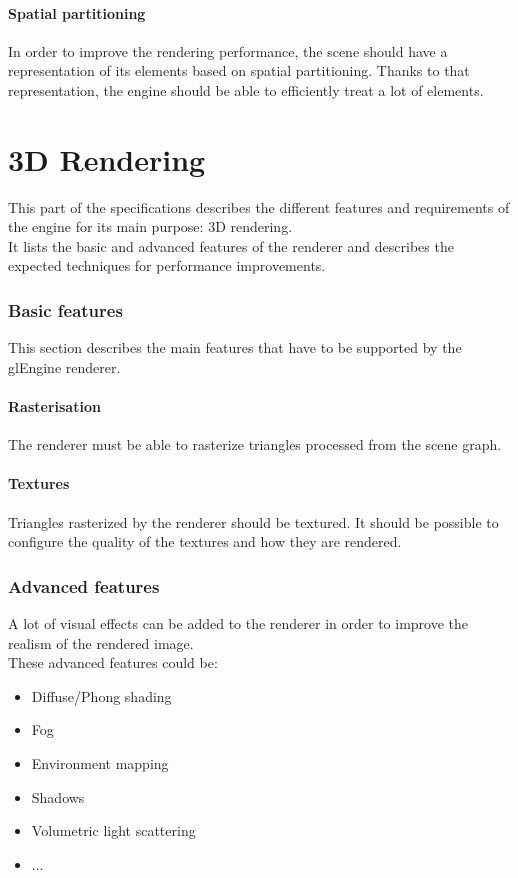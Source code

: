 \documentclass [a4 paper,11pt]{article}
\begin{document}
\subsection{Spatial partitioning}
In order to improve the rendering performance, the scene should have a representation of its elements based on spatial partitioning. Thanks to that representation, the engine should be able to efficiently treat a lot of elements.

\part{3D Rendering}
This part of the specifications describes the different features and requirements of the engine for its main purpose: 3D rendering.\\
It lists the basic and advanced features of the renderer and describes the expected techniques for performance improvements.

\section{Basic features}
This section describes the main features that have to be supported by the glEngine renderer.

\subsection{Rasterisation}
The renderer must be able to rasterize triangles processed from the scene graph.
\subsection{Textures}
Triangles rasterized by the renderer should be textured. It should be possible to configure the quality of the textures and how they are rendered.

\section{Advanced features}
A lot of visual effects can be added to the renderer in order to improve the realism of the rendered image.\\
These advanced features could be:
\begin{itemize}
\item Diffuse/Phong shading
\item Fog
\item Environment mapping
\item Shadows
\item Volumetric light scattering
\item ...
\end{itemize}
\end{document}
